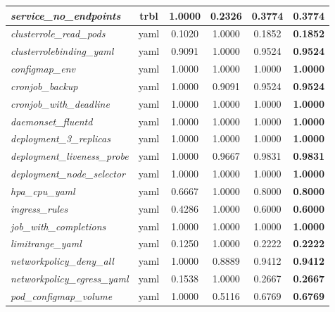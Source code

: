 \begin{footnotesize}
\begin{longtable}{|p{3.6cm}|c|c|c|c|c|}
\hline
\textit{service\_\allowbreak{}no\_\allowbreak{}endpoints} & trbl & 1.0000 & 0.2326 & 0.3774 & \textbf{0.3774} \\
\hline
\textit{clusterrole\_\allowbreak{}read\_\allowbreak{}pods} & yaml & 0.1020 & 1.0000 & 0.1852 & \textbf{0.1852} \\
\hline
\textit{clusterrolebinding\_\allowbreak{}yaml} & yaml & 0.9091 & 1.0000 & 0.9524 & \textbf{0.9524} \\
\hline
\textit{configmap\_\allowbreak{}env} & yaml & 1.0000 & 1.0000 & 1.0000 & \textbf{1.0000} \\
\hline
\textit{cronjob\_\allowbreak{}backup} & yaml & 1.0000 & 0.9091 & 0.9524 & \textbf{0.9524} \\
\hline
\textit{cronjob\_\allowbreak{}with\_\allowbreak{}deadline} & yaml & 1.0000 & 1.0000 & 1.0000 & \textbf{1.0000} \\
\hline
\textit{daemonset\_\allowbreak{}fluentd} & yaml & 1.0000 & 1.0000 & 1.0000 & \textbf{1.0000} \\
\hline
\textit{deployment\_\allowbreak{}3\_\allowbreak{}replicas} & yaml & 1.0000 & 1.0000 & 1.0000 & \textbf{1.0000} \\
\hline
\textit{deployment\_\allowbreak{}liveness\_\allowbreak{}probe} & yaml & 1.0000 & 0.9667 & 0.9831 & \textbf{0.9831} \\
\hline
\textit{deployment\_\allowbreak{}node\_\allowbreak{}selector} & yaml & 1.0000 & 1.0000 & 1.0000 & \textbf{1.0000} \\
\hline
\textit{hpa\_\allowbreak{}cpu\_\allowbreak{}yaml} & yaml & 0.6667 & 1.0000 & 0.8000 & \textbf{0.8000} \\
\hline
\textit{ingress\_\allowbreak{}rules} & yaml & 0.4286 & 1.0000 & 0.6000 & \textbf{0.6000} \\
\hline
\textit{job\_\allowbreak{}with\_\allowbreak{}completions} & yaml & 1.0000 & 1.0000 & 1.0000 & \textbf{1.0000} \\
\hline
\textit{limitrange\_\allowbreak{}yaml} & yaml & 0.1250 & 1.0000 & 0.2222 & \textbf{0.2222} \\
\hline
\textit{networkpolicy\_\allowbreak{}deny\_\allowbreak{}all} & yaml & 1.0000 & 0.8889 & 0.9412 & \textbf{0.9412} \\
\hline
\textit{networkpolicy\_\allowbreak{}egress\_\allowbreak{}yaml} & yaml & 0.1538 & 1.0000 & 0.2667 & \textbf{0.2667} \\
\hline
\textit{pod\_\allowbreak{}configmap\_\allowbreak{}volume} & yaml & 1.0000 & 0.5116 & 0.6769 & \textbf{0.6769} \\

\end{longtable}
\end{footnotesize}
